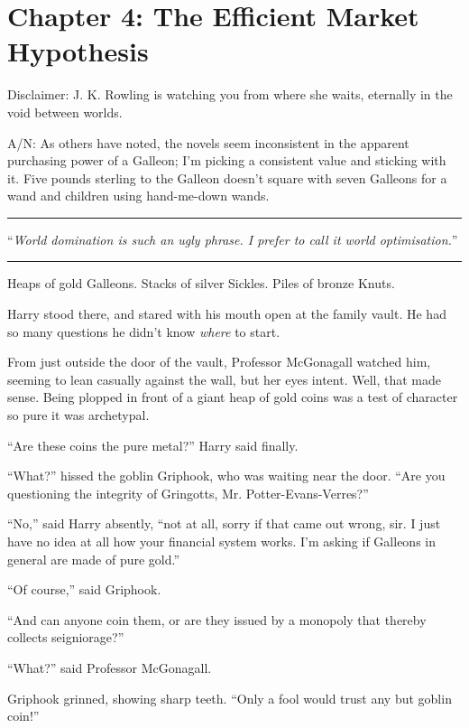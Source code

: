 \chapter{Chapter 4: The Efficient Market Hypothesis}
Disclaimer: J. K. Rowling is watching you from where she waits, eternally in the void between worlds.

A/N: As others have noted, the novels seem inconsistent in the apparent purchasing power of a Galleon; I'm picking a consistent value and sticking with it. Five pounds sterling to the Galleon doesn't square with seven Galleons for a wand and children using hand-me-down wands.

\begin{center}\rule{3in}{0.4pt}\end{center}

``\emph{World domination is such an ugly phrase. I prefer to call it world optimisation.}''

\begin{center}\rule{3in}{0.4pt}\end{center}

Heaps of gold Galleons. Stacks of silver Sickles. Piles of bronze Knuts.

Harry stood there, and stared with his mouth open at the family vault. He had so many questions he didn't know \emph{where} to start.

From just outside the door of the vault, Professor McGonagall watched him, seeming to lean casually against the wall, but her eyes intent. Well, that made sense. Being plopped in front of a giant heap of gold coins was a test of character so pure it was archetypal.

``Are these coins the pure metal?'' Harry said finally.

``What?'' hissed the goblin Griphook, who was waiting near the door. ``Are you questioning the integrity of Gringotts, Mr. Potter-Evans-Verres?''

``No,'' said Harry absently, ``not at all, sorry if that came out wrong, sir. I just have no idea at all how your financial system works. I'm asking if Galleons in general are made of pure gold.''

``Of course,'' said Griphook.

``And can anyone coin them, or are they issued by a monopoly that thereby collects seigniorage?''

``What?'' said Professor McGonagall.

Griphook grinned, showing sharp teeth. ``Only a fool would trust any but goblin coin!''

